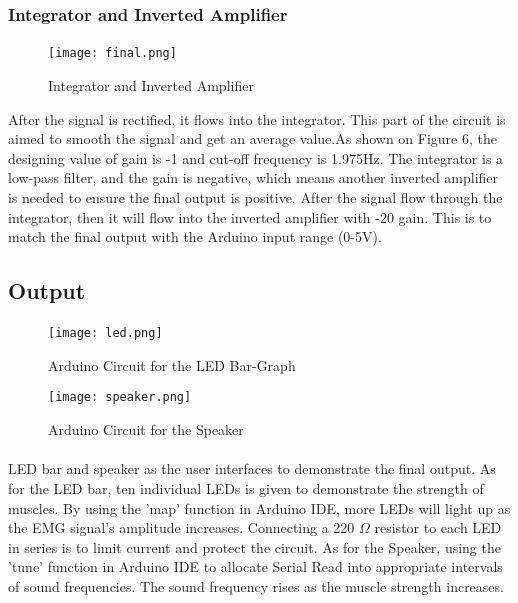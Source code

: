 \documentclass[12pt]{article}
\begin{document}
    
    
    \subsubsection{Integrator and Inverted Amplifier}
    \paragraph{}
    \begin{wrapfigure}{c}{5cm}
    \texttt{[image: final.png]}
    \caption{Integrator and Inverted Amplifier}
    \end{wrapfigure}
    After the signal is rectified, it flows into the integrator. This part of the circuit is aimed to smooth the signal and get an average value.As shown on Figure 6, the designing value of gain is -1 and cut-off frequency is 1.975Hz. The integrator is a low-pass filter, and the gain is negative, which means another inverted amplifier is needed to ensure the final output is positive. After the signal flow through the integrator, then it will flow into the inverted amplifier with -20 gain. This is to match the final output with the Arduino input range (0-5V). 
    
    
    
    
    \subsection{Output}
    \paragraph{}
    \begin{figure}[h]
    \centering
    \begin{minipage}[t]{0.48\textwidth}
    \centering
    \texttt{[image: led.png]}
    \caption{Arduino Circuit for the LED Bar-Graph}
    \end{minipage}
    \begin{minipage}[t]{0.48\textwidth}
    \centering
    \texttt{[image: speaker.png]}
    \caption{Arduino Circuit for the Speaker}
    \end{minipage}
    \end{figure}
    \paragraph{}
    LED bar and speaker as the user interfaces to demonstrate the final output. As for the LED bar, ten individual LEDs is given to demonstrate the strength of muscles. By using the 'map' function in Arduino IDE, more LEDs will light up as the EMG signal's amplitude increases. Connecting a 220 $\Omega$ resistor to each LED in series is to limit current and protect the circuit. As for the Speaker, using the 'tune' function in Arduino IDE to allocate Serial Read into appropriate intervals of sound frequencies. The sound frequency rises as the muscle strength increases.
    
\end{document}
